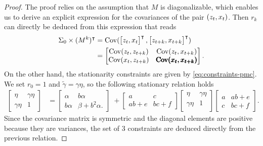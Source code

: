 \begin{proof}
    The proof relies on the assumption that  $M$ is diagonalizable, 
    which enables us to derive an explicit expression for the
    covariances of the pair $(z_t,x_t)$. 
    Then $r_k$ can directly be deduced from this expression that reads
    \begin{align*}
        \Sigma_0 \times  (M^k)^\intercal & = \Cov (
            \begin{bmatrix} \latent_t , \obs_t \end{bmatrix}^\intercal, 
            \begin{bmatrix} \latent_{t+k} , \obs_{t+k} \end{bmatrix}^\intercal) \\
        &=\begin{bmatrix}
        \Cov(\latent_{t},\latent_{t+k}) &  \Cov(\latent_{t},\obs_{t+k})\\ 
        \Cov(\obs_{t},\latent_{t+k}) & \pmb{\Cov(\obs_{t},\obs_{t+k})}%
        \end{bmatrix}\text{.}
    \end{align*}
    On the other hand, the stationarity constraints are given by \eqref{eq:constraints-pmc}.
    We set $r_0=1$ and $\tilde{\gamma}=\gamma \eta$, so the following 
    stationary relation holds
    \begin{align*}
     \begin{bmatrix}
     \eta & \gamma \eta\\ 
     \gamma \eta & 1
    \end{bmatrix}  &=  \begin{bmatrix}
    \alpha & b\alpha \\ 
    b\alpha & \beta + b^2\alpha.
    \end{bmatrix} \; +    \begin{bmatrix}
    a & c\\ 
    ab+e & bc+f
    \end{bmatrix} 
     \begin{bmatrix}
    \eta &  \gamma \eta\\ 
    \gamma \eta & 1 \\ 
    \end{bmatrix}  
    \begin{bmatrix}
    a & ab+e\\ 
    c & bc+f
    \end{bmatrix}\text{.}
    \end{align*}
    Since the covariance matrix is symmetric and the diagonal elements are positive because
    they are variances, the set of 3 constraints are deduced directly from the previous relation.        
\end{proof}

